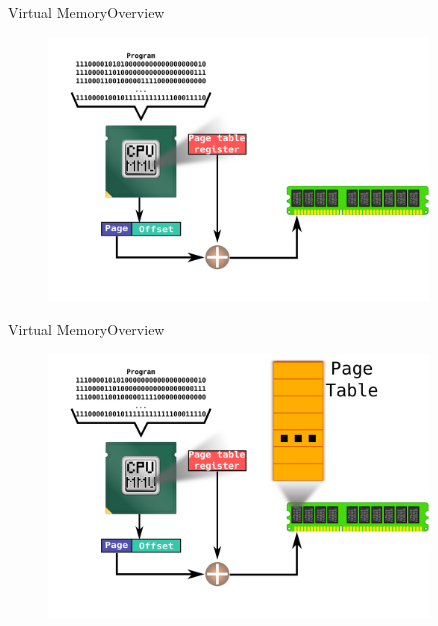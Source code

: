 \documentclass[10pt]{beamer}
\begin{document}
\begin{frame}{Virtual Memory}{Overview}
  \begin{figure}[ht]
    \centering
    \includegraphics[width=0.9\textwidth, keepaspectratio=true]{images/mmu_c.png}
  \end{figure}
\end{frame}

\begin{frame}{Virtual Memory}{Overview}
  \begin{figure}[ht]
    \centering
    \includegraphics[width=0.9\textwidth, keepaspectratio=true]{images/mmu_d.png}
  \end{figure}
\end{frame}
\end{document}
